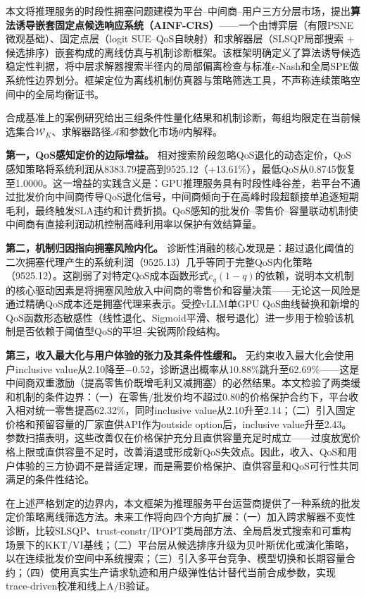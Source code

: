 \documentclass[UTF8,11pt]{ctexart}
\begin{document}
本文将推理服务的时段性拥塞问题建模为平台--中间商--用户三方分层市场，提出\textbf{算法诱导嵌套固定点候选响应系统（AINF-CRS）}——一个由博弈层（有限PSNE微观基础）、固定点层（logit SUE--QoS自映射）和求解器层（SLSQP局部搜索 + 候选排序）嵌套构成的离线仿真与机制诊断框架。该框架明确定义了算法诱导候选稳定性判据，将中层求解器搜索半径内的局部偏离检查与标准$\epsilon$-Nash和全局SPE做系统性边界划分。框架定位为离线机制仿真器与策略筛选工具，不声称连续策略空间中的全局均衡证书。

合成基准上的案例研究给出三组条件性量化结果和机制诊断，每组均限定在当前候选集合$\mathcal{W}_K$、求解器路径$\mathcal{A}$和参数化市场$\theta$内解释。

\textbf{第一，QoS感知定价的边际增益。} 相对搜索阶段忽略QoS退化的动态定价，QoS感知策略将系统利润从8383.79提高到9525.12（+13.61\%），最低QoS从0.8745恢复至1.0000。这一增益的实践含义是：GPU推理服务具有时段性峰谷差，若平台不通过批发价向中间商传导QoS退化信号，中间商倾向于在高峰时段超额接单追逐短期毛利，最终触发SLA违约和计费折损。QoS感知的批发价--零售价--容量联动机制使中间商有直接利润动机控制高峰利用率以保护有效结算量。

\textbf{第二，机制归因指向拥塞风险内化。} 诊断性消融的核心发现是：超过退化阈值的二次拥塞代理产生的系统利润（9525.13）几乎等同于完整QoS内化策略（9525.12）。这削弱了对特定QoS成本函数形式$c_q(1-q)$的依赖，说明本文机制的核心驱动因素是将拥塞风险放入中间商的零售价和容量决策——无论这一风险是通过精确QoS成本还是拥塞代理来表示。受控vLLM单GPU QoS曲线替换和新增的QoS函数形态敏感性（线性退化、Sigmoid平滑、根号退化）进一步用于检验该机制是否依赖于阈值型QoS的平坦--尖锐两阶段结构。

\textbf{第三，收入最大化与用户体验的张力及其条件性缓和。} 无约束收入最大化会使用户inclusive value从2.10降至$-0.52$，诊断退出概率从10.88\%跳升至62.69\%——这是中间商双重激励（提高零售价既增毛利又减拥塞）的必然结果。本文检验了两类缓和机制的条件边界：（一）在零售/批发价均不超过0.80的价格保护合约下，平台收入相对统一零售提高62.32\%，同时inclusive value从2.10升至2.14；（二）引入固定价格和预留容量的厂家直供API作为outside option后，inclusive value升至2.43。参数扫描表明，这些改善仅在价格保护充分且直供容量充足时成立——过度放宽价格上限或直供容量不足时，改善消退或形成新QoS失效点。因此，收入、QoS和用户体验的三方协调不是普适定理，而是需要价格保护、直供容量和QoS可行性共同满足的条件性结论。

在上述严格划定的边界内，本文框架为推理服务平台运营商提供了一种系统的批发定价策略离线筛选方法。未来工作将向四个方向扩展：（一）加入跨求解器不变性诊断，比较SLSQP、trust-constr/IPOPT类局部方法、全局启发式搜索和可重构场景下的KKT/VI基线；（二）平台层从候选排序升级为贝叶斯优化或演化策略，以在连续批发价空间中系统搜索；（三）引入多平台竞争、模型切换和长期容量合约；（四）使用真实生产请求轨迹和用户级弹性估计替代当前合成参数，实现trace-driven校准和线上A/B验证。
\end{document}
